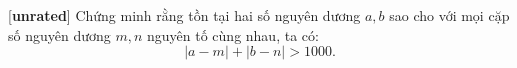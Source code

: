 \documentclass[../01-divisibility.tex]{subfiles}
\begin{document}
\begin{exercise*}\label{example:RUS-2015-TST-D10-P1}[\textbf{unrated}]
    Chứng minh rằng tồn tại hai số nguyên dương \( a, b \) sao cho với mọi cặp số nguyên dương \( m, n \) nguyên tố cùng nhau, ta có:
    \[
        |a - m| + |b - n| > 1000.
    \]
\end{exercise*}
\end{document}
